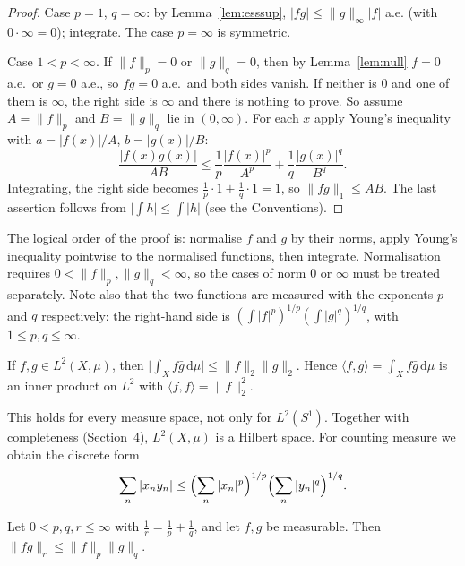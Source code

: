 \documentclass[11pt]{article}
\newcommand{\norm}[1]{\lVert #1\rVert}
\newcommand{\dmu}{\,\mathrm{d}\mu}
\begin{document}
\begin{proof}
Case $p=1$, $q=\infty$: by Lemma~\ref{lem:esssup}, $|fg|\le\norm{g}_{\infty}|f|$ a.e. (with $0\cdot\infty=0$); integrate. The case $p=\infty$ is symmetric.

Case $1<p<\infty$. If $\norm{f}_{p}=0$ or $\norm{g}_{q}=0$, then by Lemma~\ref{lem:null} $f=0$ a.e.\ or $g=0$ a.e., so $fg=0$ a.e.\ and both sides vanish. If neither is $0$ and one of them is $\infty$, the right side is $\infty$ and there is nothing to prove. So assume $A=\norm{f}_{p}$ and $B=\norm{g}_{q}$ lie in $(0,\infty)$. For each $x$ apply Young's inequality with $a=|f(x)|/A$, $b=|g(x)|/B$:
\[
\frac{|f(x)g(x)|}{AB}\le\frac{1}{p}\frac{|f(x)|^{p}}{A^{p}}+\frac{1}{q}\frac{|g(x)|^{q}}{B^{q}}.
\]
Integrating, the right side becomes $\frac1p\cdot1+\frac1q\cdot1=1$, so $\norm{fg}_{1}\le AB$. The last assertion follows from $\bigl|\int h\bigr|\le\int|h|$ (see the Conventions).
\end{proof}

\begin{remark}
The logical order of the proof is: normalise $f$ and $g$ by their norms, apply Young's inequality pointwise to the normalised functions, then integrate. Normalisation requires $0<\norm{f}_{p},\norm{g}_{q}<\infty$, so the cases of norm $0$ or $\infty$ must be treated separately. Note also that the two functions are measured with the exponents $p$ and $q$ respectively: the right-hand side is $(\int|f|^{p})^{1/p}(\int|g|^{q})^{1/q}$, with $1\le p,q\le\infty$.
\end{remark}

\begin{corollary}\label{cor:cs}
If $f,g\in L^{2}(X,\mu)$, then $\bigl|\int_{X}f\bar{g}\dmu\bigr|\le\norm{f}_{2}\norm{g}_{2}$. Hence $\langle f,g\rangle=\int_{X}f\bar{g}\dmu$ is an inner product on $L^{2}$ with $\langle f,f\rangle=\norm{f}_{2}^{2}$.
\end{corollary}

This holds for every measure space, not only for $L^{2}(S^{1})$. Together with completeness (Section~4), $L^{2}(X,\mu)$ is a Hilbert space. For counting measure we obtain the discrete form
\[
\sum_{n}|x_{n}y_{n}|\le\Bigl(\sum_{n}|x_{n}|^{p}\Bigr)^{1/p}\Bigl(\sum_{n}|y_{n}|^{q}\Bigr)^{1/q}.
\]

\begin{corollary}\label{cor:gen-holder}
Let $0<p,q,r\le\infty$ with $\frac1r=\frac1p+\frac1q$, and let $f,g$ be measurable. Then $\norm{fg}_{r}\le\norm{f}_{p}\norm{g}_{q}$.
\end{corollary}
\end{document}
